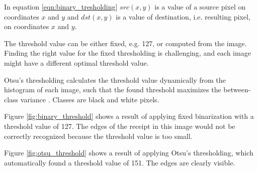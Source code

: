 \documentclass[
  digital, %
  table,   %
  oneside, %
  lof,     %
  lot,     %
]{fithesis3}
\begin{document}
\begin{enumerate}
    In equation \ref{eqn:binary_tresholding} $src(x,y)$ is a value of a source pixel on coordinates $x$ and $y$ and $dst(x,y)$ is a value of destination, i.e. resulting pixel, on coordinates $x$ and $y$.
    
    The threshold value can be either fixed, e.g. 127, or computed from the image. Finding the right value for the fixed thresholding is challenging, and each image might have a different optimal threshold value.
    
    Otsu's thresholding calculates the threshold value dynamically from the histogram of each image, such that the found threshold maximizes the between-class variance \cite{Gonzalez2008Digital}. Classes are black and white pixels.
    
    Figure \ref{fig:binary_threshold} shows a result of applying fixed binarization with a threshold value of 127. The edges of the receipt in this image would not be correctly recognized because the threshold value is too small.
    
    Figure \ref{fig:otsu_threshold} shows a result of applying Otsu's thresholding, which automatically found a threshold value of 151. The edges are clearly visible.
    

\end{enumerate}
\end{document}
